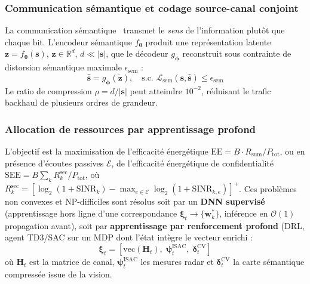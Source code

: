 \documentclass[12pt,a4paper,titlepage]{article}
\begin{document}
\subsubsection{Communication sémantique et codage source-canal conjoint}

La communication sémantique~\cite{semantic_comm} transmet le \textit{sens} de l'information plutôt que chaque bit. L'encodeur sémantique $f_{\boldsymbol{\theta}}$ produit une représentation latente $\mathbf{z} = f_{\boldsymbol{\theta}}(\mathbf{s})$, $\mathbf{z} \in \mathbb{R}^d$, $d \ll |\mathbf{s}|$, que le décodeur $g_{\boldsymbol{\phi}}$ reconstruit sous contrainte de distorsion sémantique maximale $\epsilon_{\mathrm{sem}}$ :
\begin{equation}
    \hat{\mathbf{s}} = g_{\boldsymbol{\phi}}(\tilde{\mathbf{z}}), \quad \text{s.c. } \mathcal{L}_{\mathrm{sem}}(\mathbf{s}, \hat{\mathbf{s}}) \leq \epsilon_{\mathrm{sem}}
    \label{eq:semantic_decoder}
\end{equation}
Le ratio de compression $\rho = d/|\mathbf{s}|$ peut atteindre $10^{-2}$, réduisant le trafic backhaul de plusieurs ordres de grandeur.

\subsubsection{Allocation de ressources par apprentissage profond}

L'objectif est la maximisation de l'efficacité énergétique $\mathrm{EE} = B \cdot R_{\mathrm{sum}} / P_{\mathrm{tot}}$, ou en présence d'écoutes passives $\mathcal{E}$, de l'efficacité énergétique de confidentialité $\mathrm{SEE} = B \sum_k R_k^{\mathrm{sec}} / P_{\mathrm{tot}}$, où $R_k^{\mathrm{sec}} = [\log_2(1+\mathrm{SINR}_k) - \max_{e\in\mathcal{E}} \log_2(1+\mathrm{SINR}_{k,e})]^+$. Ces problèmes non convexes et NP-difficiles sont résolus soit par un \textbf{DNN supervisé} (apprentissage hors ligne d'une correspondance $\boldsymbol{\xi}_t \to \{\mathbf{w}_k^*\}$, inférence en $\mathcal{O}(1)$ propagation avant), soit par \textbf{apprentissage par renforcement profond} (DRL, agent TD3/SAC sur un MDP dont l'état intègre le vecteur enrichi :
\begin{equation}
    \boldsymbol{\xi}_t = \left[ \mathrm{vec}(\mathbf{H}_t),\; \boldsymbol{\psi}_t^{\mathrm{ISAC}},\; \boldsymbol{\delta}_t^{\mathrm{CV}} \right]
    \label{eq:state_vector}
\end{equation}
où $\mathbf{H}_t$ est la matrice de canal, $\boldsymbol{\psi}_t^{\mathrm{ISAC}}$ les mesures radar et $\boldsymbol{\delta}_t^{\mathrm{CV}}$ la carte sémantique compressée issue de la vision.
\end{document}
